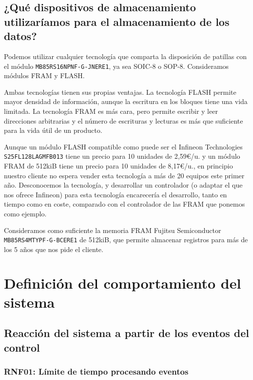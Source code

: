 \subsection{¿Qué dispositivos de almacenamiento utilizaríamos para el almacenamiento de los datos?}

Podemos utilizar cualquier tecnología que comparta la disposición de patillas con el módulo \linebreak \texttt{MB85RS16NPNF-G-JNERE1},
ya sea SOIC-8 o SOP-8. Consideramos módulos FRAM y FLASH.

Ambas tecnologías tienen sus propias ventajas. La tecnología FLASH permite mayor densidad de información,
aunque la escritura en los bloques tiene una vida limitada. La tecnología FRAM es más cara, pero permite
escribir y leer direcciones arbitrarias y el número de escrituras y lecturas es más que suficiente para la vida
útil de un producto.

Aunque un módulo FLASH compatible como puede ser el Infineon Technologies \linebreak \texttt{S25FL128LAGMFB013} tiene un
precio para 10 unidades de 2,59€/u. y un módulo FRAM de 512kiB tiene un precio para 10 unidades de
8,17€/u., en principio nuestro cliente no espera vender esta tecnología a más de 20 equipos este primer año.
Desconocemos la tecnología, y desarrollar un controlador (o adaptar el que nos ofrece Infineon) para esta tecnología
encarecería el desarrollo, tanto en tiempo como en coste, comparado con el controlador de las FRAM que ponemos como ejemplo.

Consideramos como suficiente la memoria FRAM Fujitsu Semiconductor \linebreak \texttt{MB85RS4MTYPF-G-BCERE1} de 512kiB,
que permite almacenar registros para más de los 5 años que nos pide el cliente.

\section{Definición del comportamiento del sistema}

\subsection{Reacción del sistema a partir de los eventos del control}

\subsubsection{RNF01: Límite de tiempo procesando eventos}

